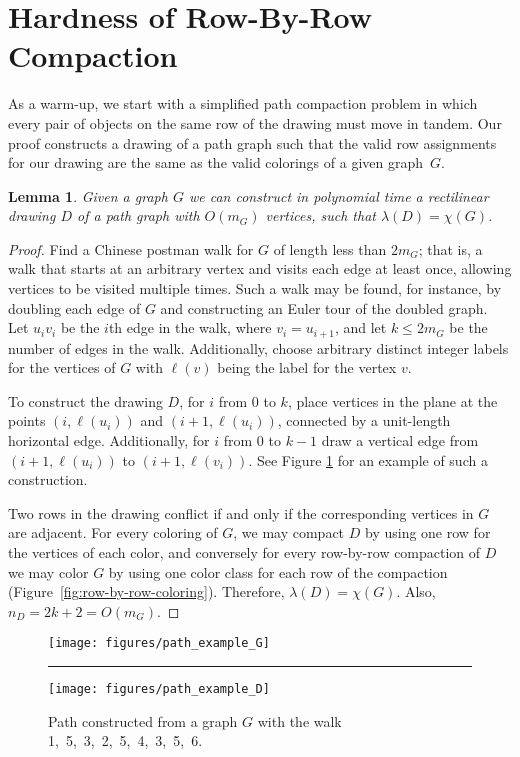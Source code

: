 \documentclass[12pt]{article}
\newtheorem{lemma}[theorem]{Lemma}
\theoremstyle{definitions}
\begin{document}
\section{Hardness of Row-By-Row Compaction}
\label{sec:row-by-row}

As a warm-up, we start with a simplified path compaction problem in which every pair of objects on the same row of the drawing must move in tandem. Our proof constructs a drawing of a path graph such that the valid row assignments for our drawing are the same as the valid colorings of a given graph~$G$.

\begin{lemma}
\label{path lemma}
Given a graph $G$ we can construct in polynomial time a rectilinear drawing $D$ of a path graph with $O(m_G)$ vertices, such that $\lambda(D) = \chi(G)$.
\end{lemma}

\begin{proof}
Find a Chinese postman walk for $G$ of length less than $2m_G$; that is, a walk that starts at an arbitrary vertex and visits each edge at least once, allowing vertices to be visited multiple times. Such a walk may be found, for instance, by doubling each edge of $G$ and constructing an Euler tour of the doubled graph. Let $u_iv_i$ be the $i$th edge in the walk, where $v_i=u_{i+1}$, and let $k\le 2m_G$ be the number of edges in the walk. Additionally, choose arbitrary distinct integer labels for the vertices of $G$  with $\ell(v)$ being the label for the vertex $v$.

To construct the drawing $D$, for $i$ from $0$ to $k$, place
vertices in the plane at the points $(i,\ell(u_i))$ and $(i+1,\ell(u_i))$, connected by a unit-length horizontal edge. Additionally, for $i$ from $0$ to $k-1$ draw a vertical edge from $(i+1,\ell(u_i))$ to $(i+1,\ell(v_i))$. See Figure \ref{fig:path_example} for an example of such a construction.

Two rows in the drawing conflict if and only
if the corresponding vertices in $G$ are adjacent. For every coloring of $G$,
we may compact $D$ by using one row for the vertices of each color, and conversely for every row-by-row compaction of $D$ we may color $G$ by using one color class for each row of the compaction (Figure~\ref{fig:row-by-row-coloring}). Therefore, $\lambda(D) = \chi(G)$. Also, $n_D=2k+2=O(m_G)$.
\end{proof}

\begin{figure}[t]
\centering
\texttt{[image: figures/path\_example\_G]}\rule{4em}{0em}
\texttt{[image: figures/path\_example\_D]}
\caption{Path constructed from a graph $G$ with the walk 1,~5,~3,~2,~5,~4,~3,~5,~6.}
\label{fig:path_example}
\end{figure}
\end{document}
